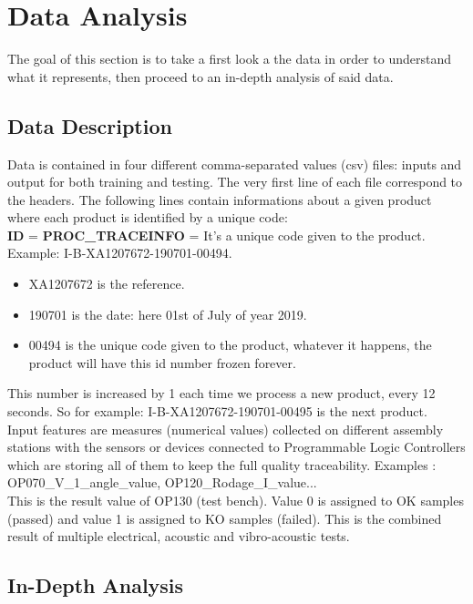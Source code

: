 \section{Data Analysis}
The goal of this section is to take a first look a the data in order to understand what it represents, then proceed to an in-depth analysis of said data.

\subsection{Data Description}
Data is contained in four different comma-separated values (csv) files: inputs and output for both training and testing. The very first line of each file correspond to the headers. The following lines contain informations about a given product where each product is identified by a unique code:\\

\textbf{ID} = \textbf{PROC\_TRACEINFO} = It's a unique code given to the product.\\
Example: I-B-XA1207672-190701-00494.
\begin{itemize}
    \item XA1207672 is the reference.  
    \item 190701 is the date: here 01st of July of year 2019.  
    \item 00494 is the unique code given to the product, whatever it happens, the product will have this id number frozen forever.
\end{itemize}

This number is increased by 1 each time we process a new product, every 12 seconds. So for example: I-B-XA1207672-190701-00495 is the next product.\\

Input features are measures (numerical values) collected on different assembly stations with the sensors or devices connected to Programmable Logic Controllers which are storing all of them to keep the full quality traceability. Examples : OP070\_V\_1\_angle\_value, OP120\_Rodage\_I\_value...\\

This is the result value of OP130 (test bench). Value 0 is assigned to OK samples (passed) and value 1 is assigned to KO samples (failed). This is the combined result of multiple electrical, acoustic and vibro-acoustic tests.

\subsection{In-Depth Analysis}

